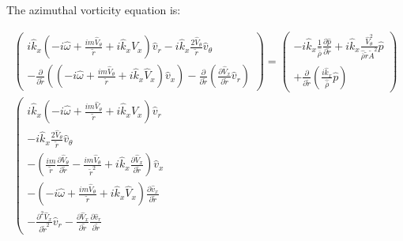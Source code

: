 \documentclass[12pt]{article}
\begin{document}
The azimuthal vorticity equation is:

\begin{small}
\begin{eqnarray}
\left(
\begin{array}{r}
i \widehat{k}_x
\left(
-i \widehat{\omega} 
+ \frac{i m \widehat{V}_{\theta}}{\widetilde{r}}
+i \widehat{k}_x \widehat{V}_x 
\right) 
\widehat{v}_r 
-
i \widehat{k}_x
\frac{2 \widehat{V}_{\theta}}{\widetilde{r}} \widehat{v}_{\theta}
\\
-\frac{\partial}{\partial \widetilde{r}}
\left(
\left(
-i \widehat{\omega}
+ \frac{i m \widehat{V}_{\theta}}{\widetilde{r}}
+i \widehat{k}_x \widehat{V}_x 
\right) 
\widehat{v}_{x} 
\right)
-\frac{\partial}{\partial \widetilde{r}}
\left(
\frac{\partial \widehat{V}_x}{\partial \widetilde{r}} \widehat{v}_r
\right)
\end{array}
\right)
 = 
\left(
\begin{array}{r}
-
i \widehat{k}_x
\frac{1}{\widehat{\overline{\rho}}} \frac{\partial \widehat{p}}{\partial \widetilde{r}}
+
i \widehat{k}_x
\frac{\widehat{V}_{\theta}^2}{\widehat{\overline{\rho}} \widetilde{r} \widetilde{A}^2} 
\widehat{p}
\\
+\frac{\partial}{\partial \widetilde{r}}
\left(
\frac{i \widehat{k}_x}{\widehat{\overline{\rho}}} \widehat{p}
\right)
\end{array}
\right)
\nonumber
\\
\left(
\begin{array}{r}
i \widehat{k}_x
\left(
-i \widehat{\omega} 
+ \frac{i m \widehat{V}_{\theta}}{\widetilde{r}}
+i \widehat{k}_x \widehat{V}_x 
\right) 
\widehat{v}_r 
\\
-
i \widehat{k}_x
\frac{2 \widehat{V}_{\theta}}{\widetilde{r}} \widehat{v}_{\theta}
\\
-
\left(
\frac{i m}{\widetilde{r}}
\frac{\partial \widehat{V}_{\theta}
}{\partial \widetilde{r}}
- 
\frac{i m \widehat{V}_{\theta}}{\widetilde{r}^2}
+i \widehat{k}_x 
\frac{\partial
\widehat{V}_x 
}{\partial \widetilde{r}}
\right) 
\widehat{v}_{x} 
\\
-
\left(
-i \widehat{\omega}
+ \frac{i m \widehat{V}_{\theta}}{\widetilde{r}}
+i \widehat{k}_x \widehat{V}_x 
\right) 
\frac{\partial
\widehat{v}_{x} 
}{\partial \widetilde{r}}
\\
-
\frac{\partial^2 \widehat{V}_x}{\partial \widetilde{r}^2} \widehat{v}_r
-
\frac{\partial \widehat{V}_x}{\partial \widetilde{r}} 
\frac{\partial
\widehat{v}_r
}{\partial \widetilde{r}}
\end{array}

\end{eqnarray}
\end{small}
\end{document}
